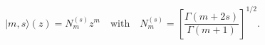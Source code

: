 \begin{equation}
|m,s\rangle(z)= N_m^{(s)} z^m
\quad\text{with}\quad
N_m^{(s)}=\left[\frac{\Gamma(m+2s)}{\Gamma(m+1)}\right]^{1/2}.
\label{basisn}
\end{equation}

